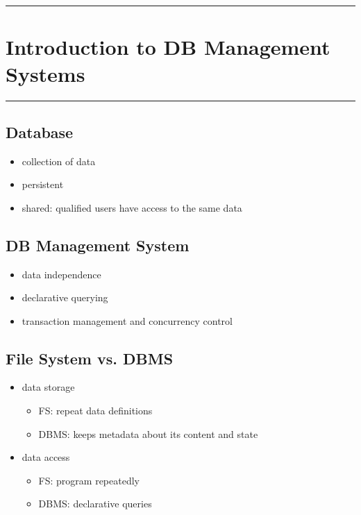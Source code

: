 \documentclass[10pt, multicolumn, a4paper]{article}
\newcommand{\lecture}[1]
{
	\hrule
	\section{#1}
	\hrule
}
\begin{document}
\linespread{1} %
\small \normalsize %


\lecture{Introduction to DB Management Systems}

\begin{multicols}{2}

\iffalse %
	File Systems vs. DBMS
	Overview of Core Database Functionalities
		- Data Independence
		- Declarative Querying
		- Transactions
	Metadata
\fi %
	
	\subsection*{Database}
	\begin{itemize}
	\item collection of data
	\item persistent
	\item shared: qualified users have access to the same data
	\end{itemize}
	
	\subsection*{DB Management System}
	\begin{itemize}
	\item data independence
	\item declarative querying
	\item transaction management and concurrency control 
	\end{itemize}

	\subsection*{File System vs. DBMS}
	\begin{itemize}
	\item data storage
		\begin{itemize}
		\item FS: repeat data definitions 
		\item DBMS: keeps metadata about its content and state
		\end{itemize}
	\item data access
		\begin{itemize}
		\item FS: program repeatedly
		\item DBMS: declarative queries
		\end{itemize}
	\end{itemize}

\end{multicols}
\end{document}
